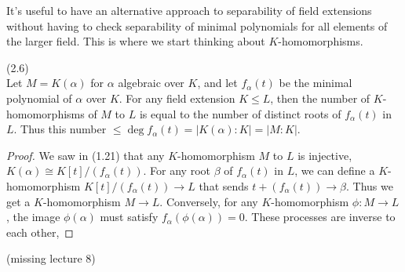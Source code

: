 \documentclass[a4paper]{article}
\begin{document}
\begin{rem}
It's useful to have an alternative approach to separability of field extensions without having to check separability of minimal polynomials for all elements of the larger field. This is where we start thinking about $K$-homomorphisms.
\end{rem}

\begin{lemma} (2.6)\\
Let $M = K(\alpha)$ for $\alpha$ algebraic over $K$, and let $f_\alpha(t)$ be the minimal polynomial of $\alpha$ over $K$. For any field extension $K \leq L$, then the number of $K$-homomorphisms of $M$ to $L$ is equal to the number of distinct roots of $f_\alpha(t)$ in $L$. Thus this number $\leq \deg f_\alpha(t) = |K(\alpha):K| = |M:K|$.
\begin{proof}
We saw in (1.21) that any $K$-homomorphism $M$ to $L$ is injective, $K(\alpha) \cong K[t]/(f_\alpha(t))$. For any root $\beta$ of $f_\alpha(t)$ in $L$, we can define a $K$-homomorphism $K[t]/(f_\alpha(t)) \to L$ that sends $t+(f_\alpha(t)) \to \beta$. Thus we get a $K$-homomorphism $M \to L$. Conversely, for any $K$-homomorphism $\phi:M \to L$, the image $\phi(\alpha)$ must satisfy $f_\alpha(\phi(\alpha)) = 0$. These processes are inverse to each other,
\end{proof}
\end{lemma}

(missing lecture 8)
\end{document}
